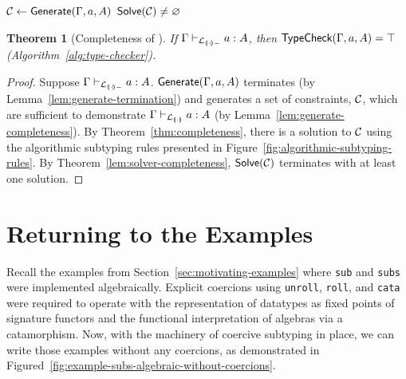 \documentclass[pdflatex,sn-mathphys-num]{sn-jnl}%
\theoremstyle{thmstyleone}%
\newtheorem{theorem}{Theorem}%
\theoremstyle{thmstyletwo}%
\theoremstyle{thmstylethree}%
\begin{document}
\begin{algorithm}[tb]
  \caption{Type checking for \lcataSub.}
  \label{alg:type-checker}
  \begin{algorithmic}[1]
    \State $\mathcal{C} \gets \textsf{Generate}(\Gamma, a, A)$
    \State \Return $\textsf{Solve}(\mathcal{C}) \neq \varnothing$
    \EndFunction
  \end{algorithmic}
\end{algorithm}

\begin{theorem}[Completeness of ]
  \label{thm:type-checker-completeness}
  If $\Gamma \vdash_{\mathcal{L}_{{\llparenthesis \cdot \rrparenthesis-}}} a : A$, then $\textsf{TypeCheck}(\Gamma, a, A) = \top$ (Algorithm~\ref{alg:type-checker}).
\end{theorem}
\begin{proof}
  Suppose $\Gamma \vdash_{\mathcal{L}_{{\llparenthesis \cdot \rrparenthesis-}}} a : A$.
  $\textsf{Generate}(\Gamma, a, A)$ terminates (by Lemma~\ref{lem:generate-termination}) and generates a set of constraints, $\mathcal{C}$, which are sufficient to demonstrate $\Gamma \vdash_{\mathcal{L}_{{\llparenthesis \cdot \rrparenthesis}}} a : A$ (by Lemma~\ref{lem:generate-completeness}).
  By Theorem~\ref{thm:completeness}, there is a solution to $\mathcal{C}$ using the algorithmic subtyping rules presented in Figure~\ref{fig:algorithmic-subtyping-rules}.
  By Theorem~\ref{lem:solver-completeness}, $\textsf{Solve}(\mathcal{C})$ terminates with at least one solution.
\end{proof}

\section{Returning to the Examples} %

Recall the examples from Section~\ref{sec:motivating-examples} where \texttt{sub} and \texttt{subs} were implemented algebraically.
Explicit coercions using \texttt{unroll}, \texttt{roll}, and \texttt{cata} were required to operate with the representation of datatypes as fixed points of signature functors and the functional interpretation of algebras via a catamorphism.
Now, with the machinery of coercive subtyping in place, we can write those examples without any coercions, as demonstrated in Figured~\ref{fig:example-subs-algebraic-without-coercions}.
\end{document}
